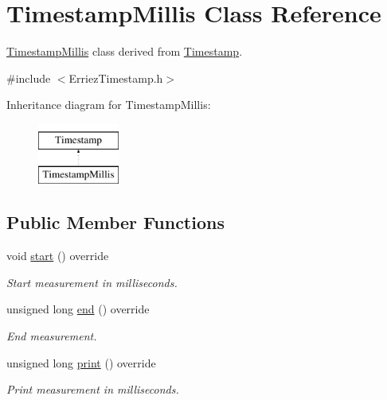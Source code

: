 \hypertarget{class_timestamp_millis}{}\section{Timestamp\+Millis Class Reference}
\label{class_timestamp_millis}


\hyperlink{class_timestamp_millis}{Timestamp\+Millis} class derived from \hyperlink{class_timestamp}{Timestamp}.  




{\ttfamily \#include $<$Erriez\+Timestamp.\+h$>$}

Inheritance diagram for Timestamp\+Millis\+:\begin{figure}[H]
\begin{center}
\leavevmode
\includegraphics[height=2.000000cm]{class_timestamp_millis}
\end{center}
\end{figure}
\subsection*{Public Member Functions}
\begin{DoxyCompactItemize}
\item 
void \hyperlink{class_timestamp_millis_a4865760b8d19a2cff0b230c8bf0123d2}{start} () override\hypertarget{class_timestamp_millis_a4865760b8d19a2cff0b230c8bf0123d2}{}\label{class_timestamp_millis_a4865760b8d19a2cff0b230c8bf0123d2}

\begin{DoxyCompactList}\small\item\em Start measurement in milliseconds. \end{DoxyCompactList}\item 
unsigned long \hyperlink{class_timestamp_millis_ad0bd89a6d30c9ee317dded214dd3084c}{end} () override
\begin{DoxyCompactList}\small\item\em End measurement. \end{DoxyCompactList}\item 
unsigned long \hyperlink{class_timestamp_millis_a4994e32cdd53388cbb550d467ddbd6f9}{print} () override
\begin{DoxyCompactList}\small\item\em Print measurement in milliseconds. \end{DoxyCompactList}\end{DoxyCompactItemize}



